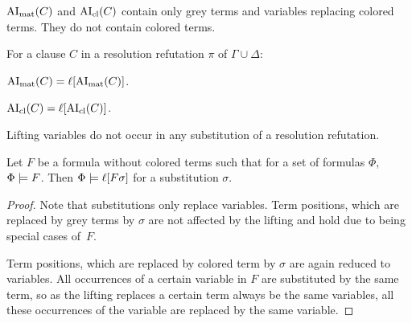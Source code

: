 \documentclass[,%
	paper=a4,%
	DIV12, %
	twoside=false,%
	liststotoc,
	bibtotoc,
	draft=false,%
	numbers=noendperiod
]{scrartcl}
\begin{document}
\begin{lemma}
	\label{lemma:no_colored_terms}
	$\operatorname{AI}_\mathrm{mat}(C)$ and $\operatorname{AI}_\mathrm{cl}(C)$ contain only grey terms and variables replacing colored terms. They do not contain colored terms.
\end{lemma}



\begin{corr}
	\label{corr:lift_ai}
	For a clause $C$ in a resolution refutation $\pi$ of $\Gamma \cup \Delta$:
	\begin{compactenum}
	\item $\operatorname{AI}_\mathrm{mat}(C) = \ell[\operatorname{AI}_\mathrm{mat}(C)]$.

	\item $\operatorname{AI}_\mathrm{cl}(C) = \ell[\operatorname{AI}_\mathrm{cl}(C)]$.
	\end{compactenum}
\end{corr}

\begin{lemma}
	\label{lemma:no_lifting_vars_in_subst}
	Lifting variables do not occur in any substitution of a resolution refutation.
\end{lemma}

\begin{lemma}
	\label{lemma:substitute_and_lift}
	Let $F$ be a formula without colored terms such that for a set of formulas $\Phi$, $\Phi \models F$.
	Then $\Phi \models \ell[F\sigma]$ for a substitution $\sigma$.
\end{lemma}
\begin{proof}
	Note that substitutions only replace variables. Term positions, which are replaced by grey terms by $\sigma$ are not affected by the lifting and hold due to being special cases of~$F$.

	Term positions, which are replaced by colored term by $\sigma$ are again reduced to variables.
	All occurrences of a certain variable in $F$ are substituted by the same term, so as the lifting replaces a certain term always be the same variables, all these occurrences of the variable are replaced by the same variable.
\end{proof}
\end{document}
